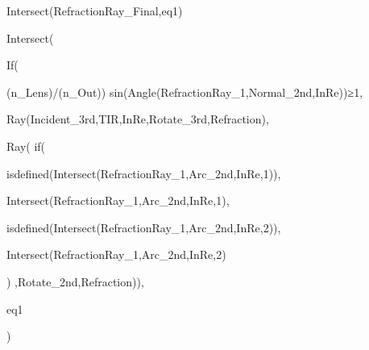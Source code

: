 Intersect(RefractionRay_{Final},eq1)

Intersect(

  If(
    
  (n_{Lens})/(n_{Out})) sin(Angle(RefractionRay_{1},Normal_{2nd,InRe}))≥1,
  
  Ray(Incident_{3rd,TIR,InRe},Rotate_{3rd,Refraction}),
  
  Ray(  if(
    

    isdefined(Intersect(RefractionRay_{1},Arc_{2nd,InRe},1)),

    Intersect(RefractionRay_{1},Arc_{2nd,InRe},1),

    isdefined(Intersect(RefractionRay_{1},Arc_{2nd,InRe},2)),

    Intersect(RefractionRay_{1},Arc_{2nd,InRe},2)

  )
,Rotate_{2nd,Refraction})),
  
  eq1
  
)